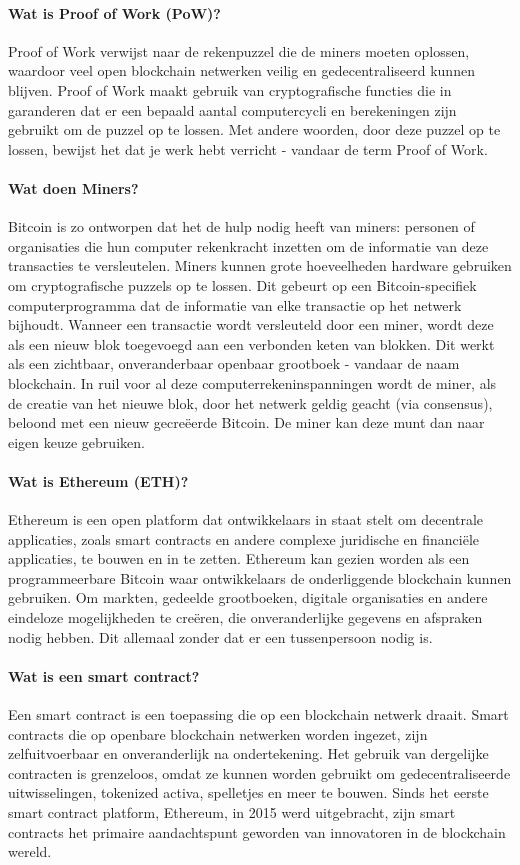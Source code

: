 \paragraph{Wat is Proof of Work (PoW)?} Proof of Work verwijst naar de rekenpuzzel die de miners moeten oplossen, waardoor veel open blockchain netwerken veilig en gedecentraliseerd kunnen blijven. Proof of Work maakt gebruik van cryptografische functies die in garanderen dat er een bepaald aantal computercycli en berekeningen zijn gebruikt om de puzzel op te lossen. Met andere woorden, door deze puzzel op te lossen, bewijst het dat je werk hebt verricht - vandaar de term Proof of Work. 

\paragraph{Wat doen Miners?} Bitcoin is zo ontworpen dat het de hulp nodig heeft van miners: personen of organisaties die hun computer rekenkracht inzetten om de informatie van deze transacties te versleutelen. Miners kunnen grote hoeveelheden hardware gebruiken om cryptografische puzzels op te lossen. Dit gebeurt op een Bitcoin-specifiek computerprogramma dat de informatie van elke transactie op het netwerk bijhoudt. Wanneer een transactie wordt versleuteld door een miner, wordt deze als een nieuw blok toegevoegd aan een verbonden keten van blokken. Dit werkt als een zichtbaar, onveranderbaar openbaar grootboek - vandaar de naam blockchain. In ruil voor al deze computerrekeninspanningen wordt de miner, als de creatie van het nieuwe blok, door het netwerk geldig geacht (via consensus), beloond met een nieuw gecre{\"e}erde Bitcoin. De miner kan deze munt dan naar eigen keuze gebruiken.

\paragraph{Wat is Ethereum (ETH)?} Ethereum is een open platform dat ontwikkelaars in staat stelt om decentrale applicaties, zoals smart contracts en andere complexe juridische en financi\"ele applicaties, te bouwen en in te zetten. Ethereum kan gezien worden als een programmeerbare Bitcoin waar ontwikkelaars de onderliggende blockchain kunnen gebruiken. Om markten, gedeelde grootboeken, digitale organisaties en andere eindeloze mogelijkheden te cre\"eren, die onveranderlijke gegevens en afspraken nodig hebben. Dit allemaal zonder dat er een tussenpersoon nodig is.

\paragraph{Wat is een smart contract?} 
Een smart contract is een toepassing die op een blockchain netwerk draait. Smart contracts die op openbare blockchain netwerken worden ingezet, zijn zelfuitvoerbaar en onveranderlijk na ondertekening. Het gebruik van dergelijke contracten is grenzeloos, omdat ze kunnen worden gebruikt om gedecentraliseerde uitwisselingen, tokenized activa, spelletjes en meer te bouwen. Sinds het eerste smart contract platform, Ethereum, in 2015 werd uitgebracht, zijn smart contracts het primaire aandachtspunt geworden van innovatoren in de blockchain wereld.

